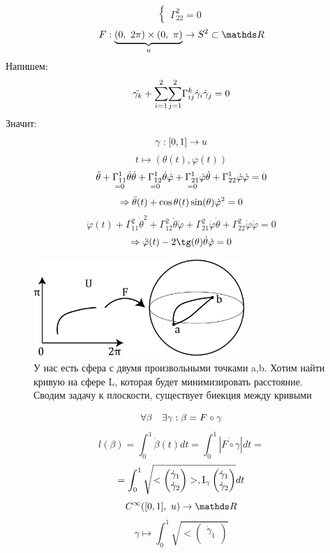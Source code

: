 \documentclass[main]{subfiles}
\begin{document}
\begin{sol}
\[\begin{cases}
            \Gamma_{22}^2 = 0
        \end{cases}\]
        \[F: \ub{u}{(0,\ 2\pi) \times (0,\ \pi)} \ra S^2 \subset \R\]
        Напишем:
        \[\ddot{\gamma_k} + \underset{i=1}{\overset{2}{\sum}} \underset{j=1}{\overset{2}{\sum}} \Gamma_{ij}^k \dot{\gamma}_i \dot{\gamma}_j = 0\]
        Значит:
        \[\gamma: [0,1] \rightarrow u\]
        \[t \mapsto (\theta(t), \varphi(t))\]
        \[\ddot{\theta} + \underset{=0}{\Gamma_{11}^1} \dot{\theta} \dot{\theta} + \underset{=0}{\Gamma_{12}^1} \dot{\theta} \dot{\varphi} + \underset{=0}{\Gamma_{21}^1} \dot{\varphi} \dot{\theta} + \Gamma_{22}^1 \dot{\varphi} \dot{\varphi} = 0\]
        \[\Rightarrow \ddot{\theta}(t) + \cos \theta(t) \sin (\theta) \dot{\varphi}^2 = 0\]
        \[\ddot{\varphi}(t) + \Gamma_{11}^2 \dot{\theta}^2 + \Gamma_{12}^2 \dot{\theta} \dot{\varphi} + \Gamma_{21}^2 \dot{\varphi} \dot{\theta} + \Gamma_{22}^2 \dot{\varphi} \dot{\varphi} = 0\]
        \[\Ra \ddot{\varphi}(t) - 2\tg(\theta) \dot{\theta} \dot{\varphi} = 0\]
        \begin{figure}[H]
            \centering
            \includegraphics[width=8cm]{pics/14_2}
            \caption{У нас есть сфера с двумя произвольными точками a,b. Хотим найти кривую на сфере L, которая будет минимизировать расстояние. Сводим задачу к плоскости, существует биекция между кривыми}
        \end{figure}
        \[\forall \beta \quad \exists \gamma: \beta = F \circ \gamma\]
        \[l(\beta) = \int_0^1 \dot{\beta}(t) dt = \int_0^1 |\dot{F \circ \gamma}| dt =\]
        \[= \int_0^1 \sqrt{<\begin{pmatrix}
            \dot{\gamma}_1\\
            \dot{\gamma}_2
        \end{pmatrix}>, \RNumb{1}_{\gamma} \begin{pmatrix}
            \dot{\gamma}_1\\
            \dot{\gamma}_2
        \end{pmatrix}} dt\]
        \[C^{\infty}([0,1],\ u) \ra \R\]
        \[\gamma \mapsto \int_0^1 \sqrt{<\begin{pmatrix}
            \dot{\gamma}_1\\

\end{pmatrix}}\]
\end{sol}
\end{document}
